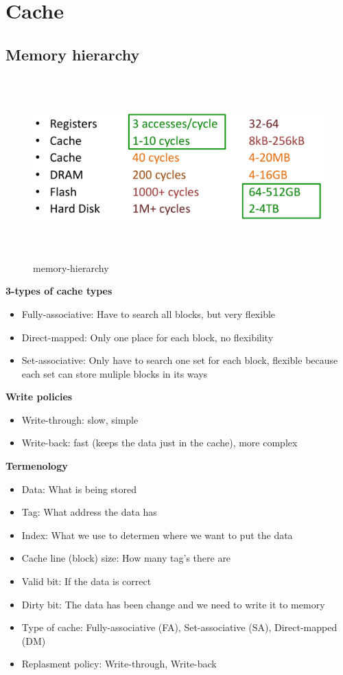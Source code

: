 \documentclass{article}
\begin{document}
\newpage


\section{Cache}
\subsection{Memory hierarchy}

\begin{figure}[h]
    \vspace{10mm}
    \centering
    \includegraphics[width=16cm, height=7cm]{image/memory-hierarchy.png}
    \caption{memory-hierarchy}
\end{figure}

\textbf{3-types of cache types}
\begin{itemize}
\item  Fully-associative: Have to search all blocks, but very flexible 
\item  Direct-mapped: Only one place for each block, no flexibility
\item  Set-associative: Only have to search one set for each block,
  flexible because each set can store muliple blocks in its ways 
\end{itemize}

\textbf{Write policies}
\begin{itemize}
\item  Write-through: slow, simple 
\item  Write-back: fast (keeps the data just in the cache), more complex
\end{itemize}

\textbf{Termenology}
\begin{itemize}
\item  Data: What is being stored
\item  Tag: What address the data has
\item  Index: What we use to determen where we want to put the data
\item  Cache line (block) size: How many tag's there are
\item  Valid bit: If the data is correct
\item  Dirty bit: The data has been change and we need to write it to memory
\item  Type of cache: Fully-associative (FA), Set-associative (SA), Direct-mapped (DM)
\item  Replasment policy: Write-through, Write-back  
\end{itemize}
\end{document}
